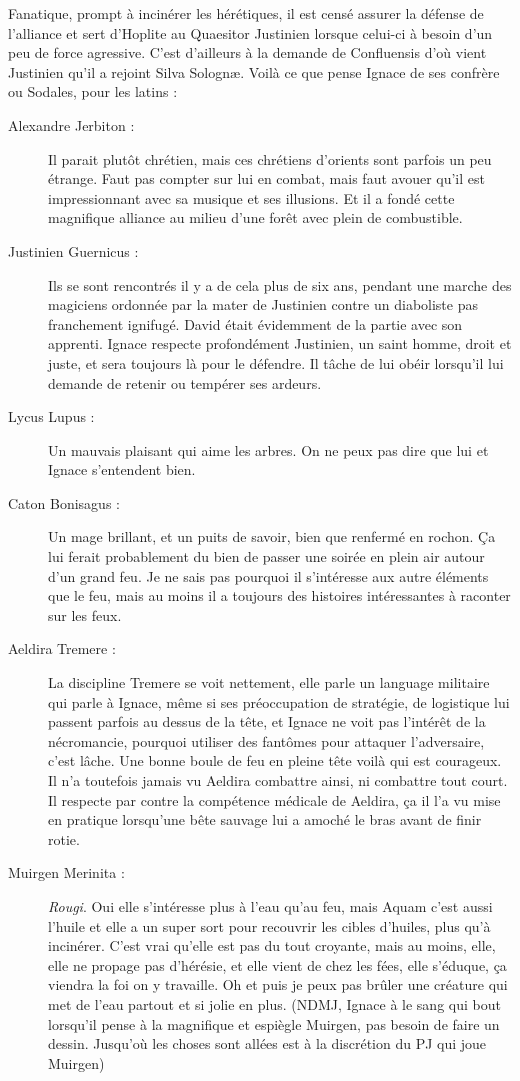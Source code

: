 Fanatique, prompt à incinérer les hérétiques, il est censé assurer la défense de l'alliance et sert d'Hoplite au Quaesitor Justinien lorsque celui-ci à besoin d'un peu de force agressive. C'est d'ailleurs à la demande de Confluensis d'où vient Justinien qu'il a rejoint Silva Solognæ. Voilà ce que pense Ignace de ses confrère ou Sodales, pour les latins :
\begin{description}
\item[Alexandre Jerbiton :] Il parait plutôt chrétien, mais ces chrétiens d'orients sont parfois un peu étrange. Faut pas compter sur lui en combat, mais faut avouer qu'il est impressionnant avec sa musique et ses illusions. Et il a fondé cette magnifique alliance au milieu d'une forêt avec plein de combustible.
\item[Justinien Guernicus :] Ils se sont rencontrés il y a de cela plus de six ans, pendant une marche des magiciens ordonnée par la mater de Justinien contre un diaboliste pas franchement ignifugé. David était évidemment de la partie avec son apprenti. Ignace respecte profondément Justinien, un saint homme, droit et juste, et sera toujours là pour le défendre. Il tâche de lui obéir lorsqu'il lui demande de retenir ou tempérer ses ardeurs.
\item[Lycus Lupus :] Un mauvais plaisant qui aime les arbres. On ne peux pas dire que lui et Ignace s'entendent bien.
\item[Caton Bonisagus :] Un mage brillant, et un puits de savoir, bien que renfermé en rochon. Ça lui ferait probablement du bien de passer une soirée en plein air autour d'un grand feu. Je ne sais pas pourquoi il s'intéresse aux autre éléments que le feu, mais au moins il a toujours des histoires intéressantes à raconter sur les feux.
\item[Aeldira Tremere :] La discipline Tremere se voit nettement, elle parle un language militaire qui parle à Ignace, même si ses préoccupation de stratégie, de logistique lui passent parfois au dessus de la tête, et Ignace ne voit pas l'intérêt de la nécromancie, pourquoi utiliser des fantômes pour attaquer l'adversaire, c'est lâche. Une bonne boule de feu en pleine tête voilà qui est courageux. Il n'a toutefois jamais vu Aeldira combattre ainsi, ni combattre tout court. Il respecte par contre la compétence médicale de Aeldira, ça il l'a vu mise en pratique lorsqu'une bête sauvage lui a amoché le bras avant de finir rotie.
\item[Muirgen Merinita :] \emph{Rougi}. Oui elle s'intéresse plus à l'eau qu'au feu, mais Aquam c'est aussi l'huile et elle a un super sort pour recouvrir les cibles d'huiles, plus qu'à incinérer. C'est vrai qu'elle est pas du tout croyante, mais au moins, elle, elle ne propage pas d'hérésie, et elle vient de chez les fées, elle s'éduque, ça viendra la foi on y travaille. Oh et puis je peux pas brûler une créature qui met de l'eau partout et si jolie en plus. %
(NDMJ, Ignace à le sang qui bout lorsqu'il pense à la magnifique et espiègle Muirgen, pas besoin de faire un dessin. Jusqu'où les choses sont allées est à la discrétion du PJ qui joue Muirgen)%
\end{description}

